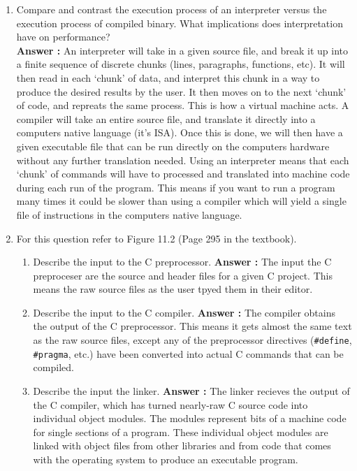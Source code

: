 \documentclass[a4paper,11pt]{article}
\newcommand{\answer}{\textbf{Answer : }}
\begin{document}
\begin{enumerate}
\item Compare and contrast the execution process of an interpreter versus the execution process of compiled binary. What implications does interpretation have on performance? \\
\answer An interpreter will take in a given source file, and break it up into a finite sequence of discrete chunks (lines, paragraphs, functions, etc). It will then read in each `chunk' of data, and interpret this chunk in a way to produce the desired results by the user. It then moves on to the next `chunk' of code, and repreats the same process. This is how a virtual machine acts. A compiler will take an entire source file, and translate it directly into a computers native language (it's ISA). Once this is done, we will then have a given executable file that can be run directly on the computers hardware without any further translation needed. Using an interpreter means that each `chunk' of commands will have to processed and translated into machine code during each run of the program. This means if you want to run a program many times it could be slower than using a compiler which will yield a single file of instructions in the computers native language. 
\newpage
\item For this question refer to Figure 11.2 (Page 295 in the textbook).
\begin{enumerate}
\item Describe the input to the C preprocessor. \answer The input the C preproceser are the source and header files for a given C project. This means the raw source files as the user tpyed them in their editor. 
\item Describe the input to the C compiler. \answer The compiler obtains the output of the C preprocessor. This means it gets almost the same text as the raw source files, except any of the preprocessor directives (\verb.#define., \verb.#pragma., etc.) have been converted into actual C commands that can be compiled.
\item Describe the input the linker. \answer The linker recieves the output of the C compiler, which has turned nearly-raw C source code into individual object modules. The modules represent bits of a machine code for single sections of a program. These individual object modules are linked with object files from other libraries and from code that comes with the operating system to produce an executable program.
\end{enumerate}


\end{enumerate}
\end{document}
